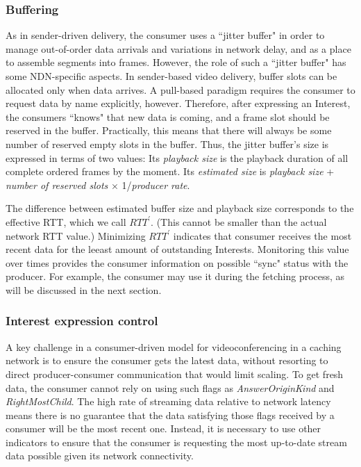 
\subsubsection{Buffering}


As in sender-driven delivery, the consumer uses a ``jitter buffer" in order to manage out-of-order data arrivals and variations in network delay, and as a place to assemble segments into frames. However, the role of such a ``jitter buffer"  has some NDN-specific aspects. In sender-based video delivery, buffer slots can be allocated only when data arrives. A pull-based paradigm requires the consumer to request data by name explicitly, however. Therefore, after expressing an Interest, the consumers ``knows" that new data is coming, and a frame slot should be reserved in the buffer. Practically, this means that there will always be some number of reserved empty slots in the buffer. Thus, the \ndnrtcName{} jitter buffer's size is expressed in terms of two values: Its  \textit{playback size} is the playback duration of all complete ordered frames by the moment. %
Its \textit{estimated size} is \textit{playback size} + \textit{number of reserved slots} $\times$ 1/\textit{producer rate}.  %

The difference between estimated buffer size and playback size corresponds to the effective RTT, which we call $RTT^{\prime}$.  (This cannot be smaller than the actual network RTT value.) Minimizing $RTT^{\prime}$ indicates that consumer receives the most recent data for the leeast amount of outstanding Interests. %
Monitoring this value over times provides the consumer information on possible ``sync" status with the producer. %
For example, the consumer may use it during the fetching process, as will be discussed in the next section. 

\subsubsection{Interest expression control}

A key challenge in a consumer-driven model for videoconferencing in a caching network is to ensure the consumer gets the latest data, without resorting to direct producer-consumer communication that would limit scaling. To get fresh data, the consumer cannot rely on using such flags as \textit{AnswerOriginKind} and \textit{RightMostChild}. The high rate of streaming data relative to network latency means there is no guarantee that the data satisfying those flags received by a consumer will be the most recent one. Instead, it is necessary to use other indicators to ensure that the consumer is requesting the most up-to-date stream data possible given its network connectivity. 

